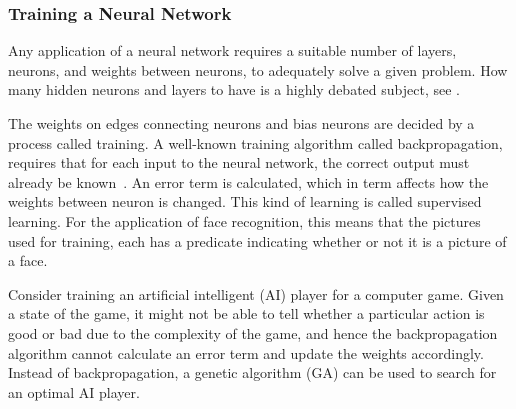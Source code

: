 \subsubsection{Training a Neural Network}
Any application of a neural network requires a suitable number of layers, neurons, and weights between neurons, to adequately solve a given problem. How many hidden neurons and layers to have is a highly debated subject, see \cite{sarle1997}.

The weights on edges connecting neurons and bias neurons are decided by a process called training. A well-known training algorithm called backpropagation, requires that for each input to the neural network, the correct output must already be known~\cite{backpropagation}. An error term is calculated, which in term affects how the weights between neuron is changed.
This kind of learning is called supervised learning. For the application of face recognition, this means that the pictures used for training, each has a predicate indicating whether or not it is a picture of a face.

Consider training an artificial intelligent (AI) player for a computer game. Given a state of the game, it might not be able to tell whether a particular action is good or bad due to the complexity of the game, and hence the backpropagation algorithm cannot calculate an error term and update the weights accordingly. Instead of backpropagation, a genetic algorithm (GA) can be used to search for an optimal AI player. 
